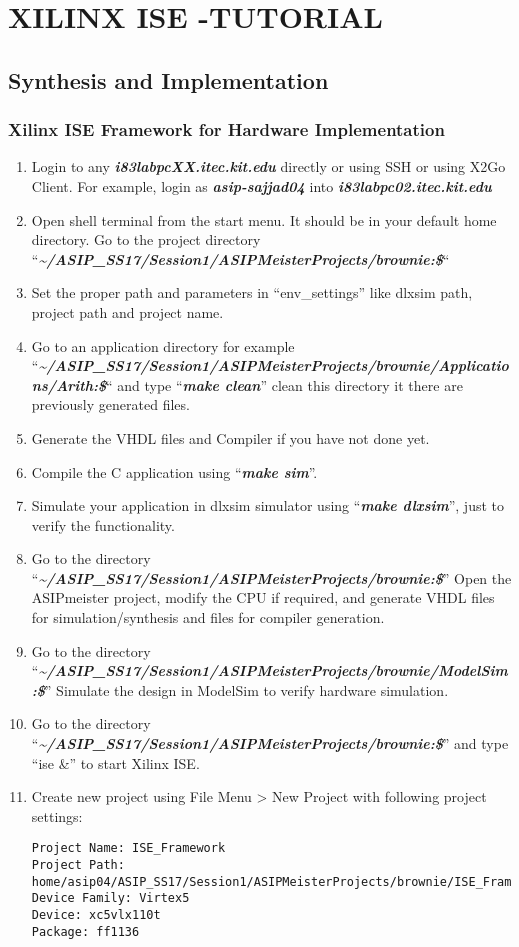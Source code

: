 \chapter*{XILINX ISE -TUTORIAL}
\section*{Synthesis and Implementation}
\subsection{Xilinx ISE Framework for Hardware Implementation}
\begin{enumerate}
	\item
	Login to any \emph{\textbf{i83labpcXX.itec.kit.edu}} directly or using
	SSH or using X2Go Client. For example, login as
	\emph{\textbf{asip-sajjad04}} into
	\emph{\textbf{i83labpc02.itec.kit.edu}}
	\item
	Open shell terminal from the start menu. It should be in your default
	home directory. Go to the project directory 
	``\emph{\small{\textbf{\textasciitilde/ASIP\_SS17/Session1/ASIPMeisterProjects/brownie:\$}}}``
	\item
	Set the proper path and parameters in ``env\_settings'' like dlxsim
	path, project path and project name.
	\item
	Go to an application directory for example 
	``\emph{\small{\textbf{\textasciitilde/ASIP\_SS17/Session1/ASIPMeisterProjects/brownie/Applications/Arith:\$}}}``
	and type ``\emph{\textbf{make clean}}'' clean this directory it there
	are previously generated files.
	\item
	Generate the VHDL files and Compiler if you have not done yet.
	\item
	Compile the C application using ``\emph{\textbf{make sim}}''.
	\item
	Simulate your application in dlxsim simulator using
	``\emph{\textbf{make dlxsim}}'', just to verify the functionality.
	\item
	Go to the directory 
	``\emph{\small{\textbf{\textasciitilde/ASIP\_SS17/Session1/ASIPMeisterProjects/brownie:\$}}}''
	Open the ASIPmeister project, modify the CPU if required, and generate
	VHDL files for simulation/synthesis and files for compiler generation.
	\item
	Go to the directory 
	``\emph{\small{\textbf{\textasciitilde/ASIP\_SS17/Session1/ASIPMeisterProjects/brownie/ModelSim:\$}}}''
	Simulate the design in ModelSim to verify hardware simulation.
	\item
	Go to the directory 
	``\emph{\small{\textbf{\textasciitilde/ASIP\_SS17/Session1/ASIPMeisterProjects/brownie:\$}}}''
	and type ``ise \&'' to start Xilinx ISE.
	\item Create new project using File Menu \textgreater{} New Project with
	following project settings:
\begin{lstlisting}
Project Name: ISE_Framework
Project Path:
home/asip04/ASIP_SS17/Session1/ASIPMeisterProjects/brownie/ISE_Framework
Device Family: Virtex5
Device: xc5vlx110t
Package: ff1136
\end{lstlisting}


\end{enumerate}
